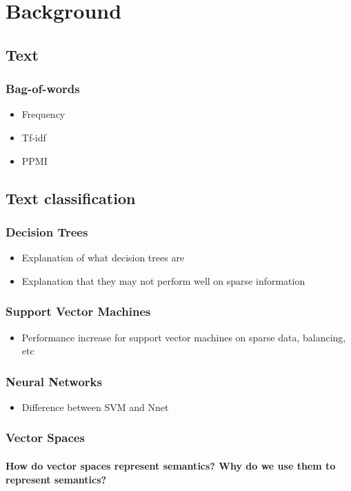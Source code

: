 \chapter{Background}
\section{Text}
\subsection{Bag-of-words}
\begin{itemize}
	\item Frequency
	\item Tf-idf
	\item PPMI
\end{itemize}
\section{Text classification}
\subsection{Decision Trees}
\begin{itemize}
	\item Explanation of what decision trees are
	\item Explanation that they may not perform well on sparse information
\end{itemize}
\subsection{Support Vector Machines}
\begin{itemize}
	\item Performance increase for support vector machines on sparse data, balancing, etc
\end{itemize}
\subsection{Neural Networks}
\begin{itemize}
	\item Difference between SVM and Nnet
\end{itemize}
\subsection{Vector Spaces}
\subsubsection{How do vector spaces represent semantics? Why do we use them to represent semantics?}\label{background:WhySpace}
